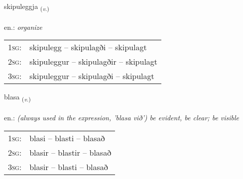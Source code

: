 \documentclass[frontgrid, backgrid]{flacards}\usepackage[]{graphicx}\usepackage[]{xcolor}
\begin{document}
\renewcommand{\flhead}{\vskip5pt \fboxsep=0pt {\small\bfseries\footnotesize Sagnorð | Verb}}
\renewcommand{\fcfoot}{\vskip5pt \fboxsep=0pt \hspace{2pt}{\small\bfseries\footnotesize 2K}}

\renewcommand{\blhead}{\vskip5pt {\small\bfseries\footnotesize Sagnorð | Verb }}
\renewcommand{\bcfoot}{\vskip5pt \hspace{2pt}{\small\bfseries\footnotesize 2K}}


{skipuleggja \small{\textsubscript{(\textit{v.})}} \\[1ex] %
\textphonetic{[scɪːpʏlɛca]} \\
en.: \emph{organize} \\  [2ex]
\renewcommand*{\arraystretch}{0.8}
\begin{tabular}{p{1cm}l}
\textsc{1sg}: & skipulegg -- skipulagði -- skipulagt \\ 
\textsc{2sg}: & skipuleggur -- skipulagðir -- skipulagt \\ 
\textsc{3sg}: & skipuleggur -- skipulagði -- skipulagt \\ 
\end{tabular}
}

\renewcommand{\flhead}{\vskip5pt \fboxsep=0pt {\small\bfseries\footnotesize Sagnorð | Verb}}
\renewcommand{\fcfoot}{\vskip5pt \fboxsep=0pt \hspace{2pt}{\small\bfseries\footnotesize 2K}}

\renewcommand{\blhead}{\vskip5pt {\small\bfseries\footnotesize Sagnorð | Verb }}
\renewcommand{\bcfoot}{\vskip5pt \hspace{2pt}{\small\bfseries\footnotesize 2K}}


{blasa \small{\textsubscript{(\textit{v.})}} \\[1ex] %
\textphonetic{[plaːsa]} \\
en.: \emph{(always used in the expression, 'blasa við') be evident, be clear; be visible} \\  [2ex]
\renewcommand*{\arraystretch}{0.8}
\begin{tabular}{p{1cm}l}
\textsc{1sg}: & blasi -- blasti -- blasað \\ 
\textsc{2sg}: & blasir -- blastir -- blasað \\ 
\textsc{3sg}: & blasir -- blasti -- blasað \\ 
\end{tabular}
}
\end{document}
